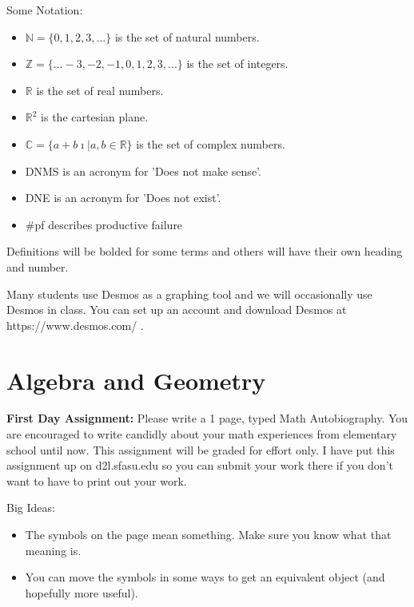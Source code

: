 Some Notation:
\begin{itemize}
\item $\mathbb{N}=\{0,1,2,3,...\}$ is the set of natural numbers.
\item $\mathbb{Z}=\{...-3,-2,-1,0,1,2,3,...\}$ is the set of integers.
\item $\mathbb{R}$ is the set of real numbers.
\item $\mathbb{R}^2$ is the cartesian plane.
\item $\mathbb{C}=\{a+b \imath | a,b \in \mathbb{R}\}$ is the set of complex numbers.
\item DNMS is an acronym for 'Does not make sense'.
\item DNE is an acronym for 'Does not exist'.
\item \#pf describes productive failure
\end{itemize}
Definitions will be bolded for some terms and others will have their own heading and number.

Many students use Desmos as a graphing tool and we will occasionally use Desmos in class. You can set up an account and download Desmos at https://www.desmos.com/ .


\mainmatter




\chapter{Algebra and Geometry}
\textbf{First Day Assignment:} Please write a 1 page, typed Math Autobiography. You are encouraged to write candidly about your math experiences from elementary school until now. This assignment will be graded for effort only. I have put this  assignment up on  d2l.sfasu.edu so you can submit your work there if you don't want to have to print out your work.

Big Ideas:
\begin{itemize}
\item The symbols on the page mean something. Make sure you know what that meaning is.
\item You can move the symbols in some ways to get an equivalent object (and hopefully more useful).
\end{itemize}

